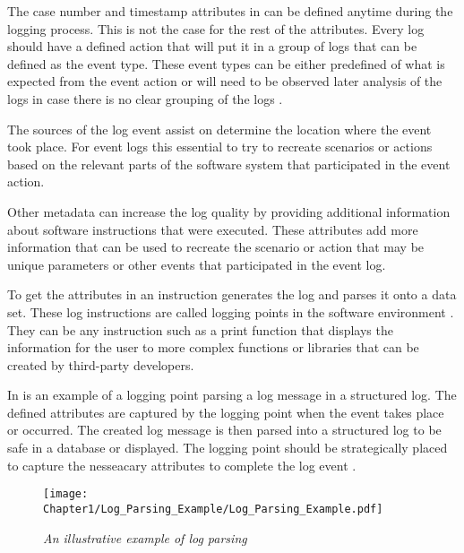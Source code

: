The case number and timestamp attributes in  can be defined anytime during the logging process. This is not the case for the rest of the attributes. Every log should have a defined action that will put it in a group of logs that can be defined as the event type. These event types can be either predefined of what is expected from the event action or will need to be observed later analysis of the logs in case there is no clear grouping of the logs \cite{Bekeneva2020, Fedaghi2010}.\par The sources of the log event assist on determine the location where the event took place. For event logs this essential to try to recreate scenarios or actions based on the relevant parts of the software system that participated in the event action.\par Other metadata can increase the log quality by providing additional information about software instructions that were executed. These attributes add more information that can be used to recreate the scenario or action that may be unique parameters or other events that participated in the event log.\par To get the attributes in  an instruction generates the log and parses it onto a data set. These log instructions are called logging points in the software environment \cite{Pecchia2015, Zhu2015}. They can be any instruction such as a print function that displays the information for the user to more complex functions or libraries that can be created by third-party developers.

\clearpage

In  is an example of a logging point parsing a log message in a structured log. The defined attributes are captured by the logging point when the event takes place or occurred. The created log message is then parsed into a structured log to be safe in a database or displayed. The logging point should be strategically placed to capture the nesseacary attributes to complete the log event \cite{Fedaghi2010}.

\begin{figure}[!htb] %
	\centering %
	\texttt{[image: Chapter1/Log\_Parsing\_Example/Log\_Parsing\_Example.pdf]}
	\caption[An illustrative example of log parsing]
	{\textit{An illustrative example of log parsing \cite{Zhu2019}}} \label{fig:ch1_logParsing}
\end{figure}

